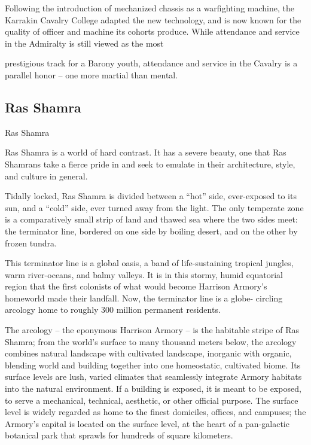 Following the introduction of mechanized chassis as a warfighting machine, the Karrakin Cavalry  
College adapted the new technology, and is now known for the quality of officer and machine its  
cohorts produce. While attendance and service in the Admiralty is still viewed as the most  

                                                                                                           


prestigious track for a Barony youth, attendance and service in the Cavalry is a parallel honor --  
one more martial than mental.   
\subsection{Ras Shamra}
Ras Shamra  

Ras Shamra is a world of hard contrast. It has a severe beauty, one that Ras Shamrans take a  
fierce pride in and seek to emulate in their architecture, style, and culture in general.   

Tidally locked, Ras Shamra is divided between a “hot” side, ever-exposed to its sun, and a “cold”  
side, ever turned away from the light. The only temperate zone is a comparatively small strip of  
land and thawed sea where the two sides meet: the terminator line, bordered on one side by  
boiling desert, and on the other by frozen tundra.   

This terminator line is a global oasis, a band of life-sustaining tropical jungles, warm river-oceans,  
and balmy valleys. It is in this stormy, humid equatorial region that the first colonists of what would  
become Harrison Armory’s homeworld made their landfall. Now, the terminator line is a globe- 
circling arcology home to roughly 300 million permanent residents.   

The arcology -- the eponymous Harrison Armory -- is the habitable stripe of Ras Shamra; from the  
world’s surface to many thousand meters below, the arcology combines natural landscape with  
cultivated landscape, inorganic with organic, blending world and building together into one  
homeostatic, cultivated biome. Its surface levels are lush, varied climates that seamlessly  
integrate Armory habitats into the natural environment. If a building is exposed, it is meant to be  
exposed, to serve a mechanical, technical, aesthetic, or other official purpose. The surface level is  
widely regarded as home to the finest domiciles, offices, and campuses; the Armory’s capital is  
located on the surface level, at the heart of a pan-galactic botanical park that sprawls for  
hundreds of square kilometers.   

